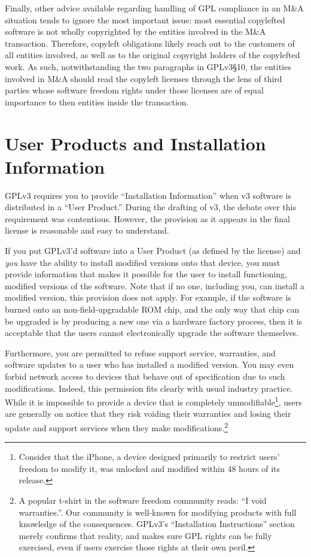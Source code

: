 Finally, other advice available regarding handling of GPL compliance in an
M\&A situation tends to ignore the most important issue: most essential
copylefted software is not wholly copyrighted by the entities involved in the
M\&A transaction.  Therefore, copyleft obligations likely reach out to the
customers of all entities involved, as well as to the original copyright
holders of the copylefted work.  As such, notwithstanding the two paragraphs
in GPLv3\S10, the entities involved in M\&A should read the copyleft licenses
through the lens of third parties whose software freedom rights under those
licenses are of equal importance to then entities inside the transaction.

\section{User Products and Installation Information}
\label{user-products}

GPLv3 requires you to provide ``Installation Information'' when v3
software is distributed in a ``User Product.''  During the drafting of v3,
the debate over this requirement was contentious.  However, the provision
as it appears in the final license is reasonable and easy to understand.

If you put GPLv3'd software into a User Product (as defined by the
license) and \emph{you} have the ability to install modified versions onto
that device, you must provide information that makes it possible for the
user to install functioning, modified versions of the software.  Note that
if no one, including you, can install a modified version, this provision
does not apply.  For example, if the software is burned onto an
non-field-upgradable ROM chip, and the only way that chip can be upgraded
is by producing a new one via a hardware factory process, then it is
acceptable that the users cannot electronically upgrade the software
themselves.

Furthermore, you are permitted to refuse support service, warranties, and
software updates to a user who has installed a modified version.  You may
even forbid network access to devices that behave out of specification due
to such modifications.  Indeed, this permission fits clearly with usual
industry practice.  While it is impossible to provide a device that is
completely unmodifiable\footnote{Consider that the iPhone, a device
  designed primarily to restrict users' freedom to modify it, was unlocked
  and modified within 48 hours of its release.}, users are generally on
notice that they risk voiding their warranties and losing their update and
support services when they make modifications.\footnote{A popular t-shirt
  in the software freedom community reads: ``I void warranties.''.  Our community is
  well-known for modifying products with full knowledge of the
  consequences.  GPLv3's ``Installation Instructions'' section merely
  confirms that reality, and makes sure GPL rights can be fully exercised,
  even if users exercise those rights at their own peril.}

